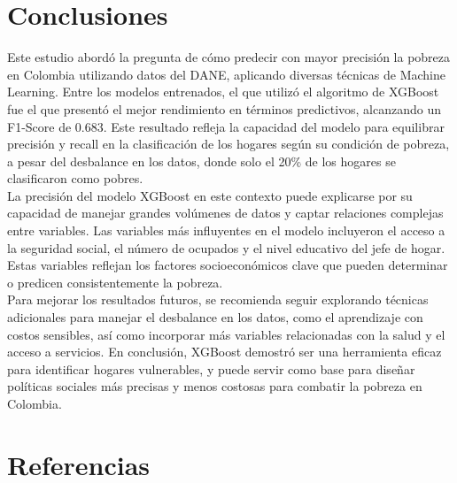 \documentclass[a4paper]{article}
\theoremstyle{remark}
\theoremstyle{definition}
\begin{document}
\section{Conclusiones}

Este estudio abordó la pregunta de cómo predecir con mayor precisión la pobreza en Colombia utilizando datos del DANE, aplicando diversas técnicas de Machine Learning. Entre los modelos entrenados, el que utilizó el algoritmo de XGBoost fue el que presentó el mejor rendimiento en términos predictivos, alcanzando un F1-Score de 0.683. Este resultado refleja la capacidad del modelo para equilibrar precisión y recall en la clasificación de los hogares según su condición de pobreza, a pesar del desbalance en los datos, donde solo el 20\% de los hogares se clasificaron como pobres. \\

La precisión del modelo XGBoost en este contexto puede explicarse por su capacidad de manejar grandes volúmenes de datos y captar relaciones complejas entre variables. Las variables más influyentes en el modelo incluyeron el acceso a la seguridad social, el número de ocupados y el nivel educativo del jefe de hogar. Estas variables reflejan los factores socioeconómicos clave que pueden determinar o predicen consistentemente la pobreza. \\

Para mejorar los resultados futuros, se recomienda seguir explorando técnicas adicionales para manejar el desbalance en los datos, como el aprendizaje con costos sensibles, así como incorporar más variables relacionadas con la salud y el acceso a servicios. En conclusión, XGBoost demostró ser una herramienta eficaz para identificar hogares vulnerables, y puede servir como base para diseñar políticas sociales más precisas y menos costosas para combatir la pobreza en Colombia.

\section{Referencias}
\end{document}
